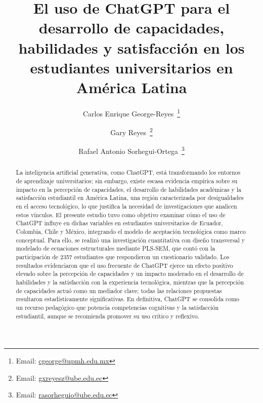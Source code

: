 \documentclass[spanish]{textolivre}
\title{El uso de ChatGPT para el desarrollo de capacidades, habilidades y satisfacción en los estudiantes universitarios en América Latina}
\author[1]{Carlos Enrique George-Reyes~\orcid{0000-0002-2529-9155}\thanks{Email: \href{mailto:cgeorge@upmh.edu.mx}{cgeorge@upmh.edu.mx}}}
\author[2]{Gary Reyes~\orcid{0000-0002-3711-1906}\thanks{Email: \href{mailto:gxreyesz@ube.edu.ec}{gxreyesz@ube.edu.ec}}}
\author[2]{Rafael Antonio Sorhegui-Ortega~\orcid{0000-0001-7882-5246}\thanks{Email: \href{mailto:rasorheguio@ube.edu.ec}{rasorheguio@ube.edu.ec}}}
\affil[1]{Universidad Politécnica Metropolitana de Hidalgo, Tolcayuca, México.}
\affil[2]{Universidad Bolivariana del Ecuador, Durán, Ecuador.}
\begin{document}
\maketitle

\begin{polyabstract}
\begin{abstract}
La inteligencia artificial generativa, como ChatGPT, está transformando los entornos de aprendizaje universitarios; sin embargo, existe escasa evidencia empírica sobre su impacto en la percepción de capacidades, el desarrollo de habilidades académicas y la satisfacción estudiantil en América Latina, una región caracterizada por desigualdades en el acceso tecnológico, lo que justifica la necesidad de investigaciones que analicen estos vínculos. El presente estudio tuvo como objetivo examinar cómo el uso de ChatGPT influye en dichas variables en estudiantes universitarios de Ecuador, Colombia, Chile y México, integrando el modelo de aceptación tecnológica como marco conceptual. Para ello, se realizó una investigación cuantitativa con diseño transversal y modelado de ecuaciones estructurales mediante PLS-SEM, que contó con la participación de 2357 estudiantes que respondieron un cuestionario validado. Los resultados evidenciaron que el uso frecuente de ChatGPT ejerce un efecto positivo elevado sobre la percepción de capacidades y un impacto moderado en el desarrollo de habilidades y la satisfacción con la experiencia tecnológica, mientras que la percepción de capacidades actuó como un mediador clave; todas las relaciones propuestas resultaron estadísticamente significativas. En definitiva, ChatGPT se consolida como un recurso pedagógico que potencia competencias cognitivas y la satisfacción estudiantil, aunque se recomienda promover su uso crítico y reflexivo.

\end{abstract}


\end{polyabstract}
\end{document}
